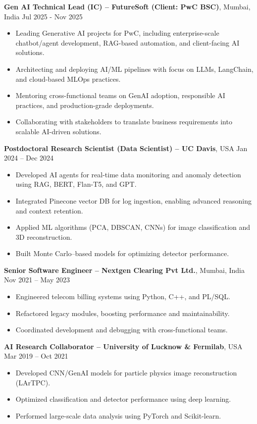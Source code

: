 \documentclass[a4paper,10pt]{article}
\begin{document}
\textbf{Gen AI Technical Lead (IC) – FutureSoft (Client: PwC BSC)}, Mumbai, India \hfill Jul 2025 - Nov 2025
\begin{itemize}[leftmargin=0.5cm]
  \item Leading Generative AI projects for PwC, including enterprise-scale chatbot/agent development, RAG-based automation, and client-facing AI solutions.
  \item Architecting and deploying AI/ML pipelines with focus on LLMs, LangChain, and cloud-based MLOps practices.
  \item Mentoring cross-functional teams on GenAI adoption, responsible AI practices, and production-grade deployments.
  \item Collaborating with stakeholders to translate business requirements into scalable AI-driven solutions.
\end{itemize}

\textbf{Postdoctoral Research Scientist (Data Scientist) – UC Davis}, USA \hfill Jan 2024 – Dec 2024
\begin{itemize}[leftmargin=0.5cm]
  \item Developed AI agents for real-time data monitoring and anomaly detection using RAG, BERT, Flan-T5, and GPT.
  \item Integrated Pinecone vector DB for log ingestion, enabling advanced reasoning and context retention.
  \item Applied ML algorithms (PCA, DBSCAN, CNNs) for image classification and 3D reconstruction.
  \item Built Monte Carlo–based models for optimizing detector performance.
\end{itemize}

\textbf{Senior Software Engineer – Nextgen Clearing Pvt Ltd.}, Mumbai, India \hfill Nov 2021 – May 2023
\begin{itemize}[leftmargin=0.5cm]
  \item Engineered telecom billing systems using Python, C++, and PL/SQL.
  \item Refactored legacy modules, boosting performance and maintainability.
  \item Coordinated development and debugging with cross-functional teams.
\end{itemize}

\textbf{AI Research Collaborator – University of Lucknow \& Fermilab}, USA \hfill Mar 2019 – Oct 2021
\begin{itemize}[leftmargin=0.5cm]
  \item Developed CNN/GenAI models for particle physics image reconstruction (LArTPC).
  \item Optimized classification and detector performance using deep learning.
  \item Performed large-scale data analysis using PyTorch and Scikit-learn.
\end{itemize}
\end{document}
